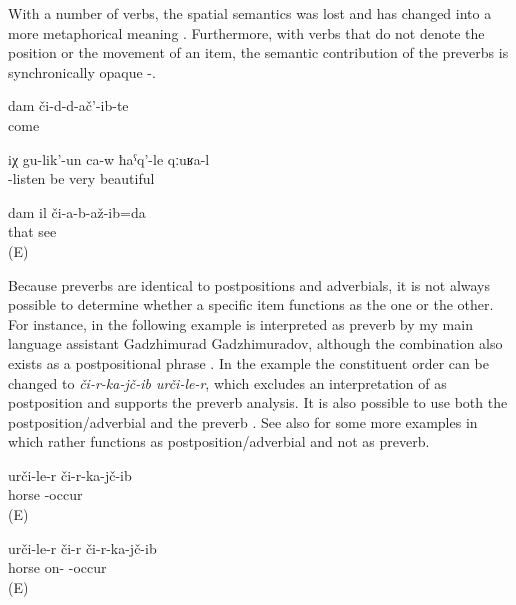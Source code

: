 With a number of verbs, the spatial semantics was lost and has changed into a more metaphorical meaning . Furthermore, with verbs that do not denote the position or the movement of an item, the semantic contribution of the preverbs is synchronically opaque -\refex{ex:I did not see it. [There is no lock}.
%
\begin{exe}
	\ex	\label{ex:(It is enough what) I experienced verbs@2}
	\gll	dam	či-d-d-ač'-ib-te\\
			come\\
	\glt	{}

	\ex	\label{ex:He is listening carefully to him verbs@3}
	\gll	iχ	gu-lik'-un	ca-w	ħaˁq'-le	qːuʁa-l\\
			-listen	be	very	beautiful\\
	\glt	{}

	\ex	\label{ex:I did not see it. [There is no lock}
	\gll	dam	il	či-a-b-až-ib=da\\
			that	see\\
	\glt	{} (E)
\end{exe}

Because preverbs are identical to postpositions and adverbials, it is not always possible to determine whether a specific item functions as the one or the other. For instance,  in the following example  is interpreted as preverb by my main language assistant Gadzhimurad Gadzhimuradov, although the combination  also exists as a postpositional phrase . In the example  the constituent order can be changed to \textit{či-r-ka-jč-ib urči-le-r}, which excludes an interpretation of  as postposition and supports the preverb analysis. It is also possible to use both the postposition/adverbial and the preverb . See also  for some more examples in which  rather functions as postposition/adverbial and not as preverb.
%
\begin{exe}
	\ex	\label{ex:He fell from the horse verbs}
	\gll	urči-le-r	či-r-ka-jč-ib\\
		horse	-occur\\
	\glt	{} (E)
	
		\ex	\label{ex:He fell from the horse verbs_1}
	\gll	urči-le-r či-r	či-r-ka-jč-ib\\
		horse on- -occur\\
	\glt	{} (E)
	
\end{exe}

